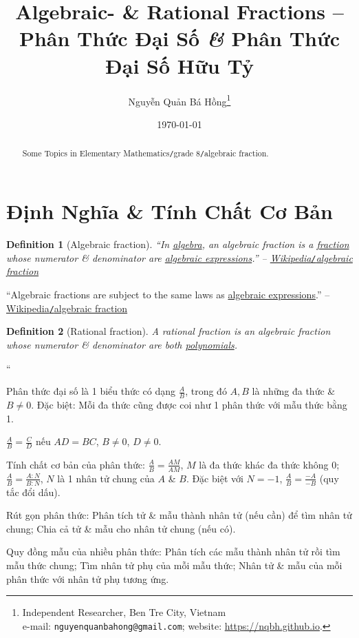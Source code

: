\documentclass{article}
\title{Algebraic- \& Rational Fractions -- Phân Thức Đại Số \textit{\&} Phân Thức Đại Số Hữu Tỷ}
\author{Nguyễn Quản Bá Hồng\footnote{Independent Researcher, Ben Tre City, Vietnam\\e-mail: \texttt{nguyenquanbahong@gmail.com}; website: \url{https://nqbh.github.io}.}}
\date{\today}
\numberwithin{equation}{section}
\newtheorem{definition}{Definition}[section]
\begin{document}
\maketitle
\begin{abstract}
	Some Topics in Elementary Mathematics\texttt{/}grade 8\texttt{/}algebraic fraction.
\end{abstract}
\setcounter{secnumdepth}{4}
\setcounter{tocdepth}{3}
\tableofcontents


\section{Định Nghĩa \& Tính Chất Cơ Bản}

\begin{definition}[Algebraic fraction]
	``In \href{https://en.wikipedia.org/wiki/Algebra}{algebra}, an \emph{algebraic fraction} is a \href{https://en.wikipedia.org/wiki/Fraction_(mathematics)}{fraction} whose numerator \& denominator are \href{https://en.wikipedia.org/wiki/Algebraic_expression}{algebraic expressions}.'' -- \href{https://en.wikipedia.org/wiki/Algebraic_fraction}{Wikipedia\emph{\texttt{/}}algebraic fraction}
\end{definition}
``Algebraic fractions are subject to the same laws as \href{https://en.wikipedia.org/wiki/Arithmetic_fraction}{algebraic expressions}.'' -- \href{https://en.wikipedia.org/wiki/Algebraic_fraction}{Wikipedia\texttt{/}algebraic fraction}

\begin{definition}[Rational fraction]
	A \emph{rational fraction} is an algebraic fraction whose numerator \& denominator are both \href{https://en.wikipedia.org/wiki/Polynomial}{polynomials}.
\end{definition}
``\begin{enumerate*}
	\item[\textbf{1.}] Phân thức đại số là 1 biểu thức có dạng $\frac{A}{B}$, trong đó $A,B$ là những đa thức \& $B\ne 0$. Đặc biệt: Mỗi đa thức cũng được coi như 1 phân thức với mẫu thức bằng 1.
	\item[\textbf{2.}] $\frac{A}{B} = \frac{C}{D}$ nếu $AD = BC$, $B\ne 0$, $D\ne 0$.
	\item[\textbf{3.}] Tính chất cơ bản của phân thức: $\frac{A}{B} = \frac{AM}{AM}$, $M$ là đa thức khác đa thức không 0; $\frac{A}{B} = \frac{A:N}{B:N}$, $N$ là 1 nhân tử chung của $A$ \& $B$. Đặc biệt với $N = -1$, $\frac{A}{B} = \frac{-A}{-B}$ (quy tắc đổi dấu).
	\item[\textbf{4.}] Rút gọn phân thức: Phân tích tử \& mẫu thành nhân tử (nếu cần) để tìm nhân tử chung; Chia cả tử \& mẫu cho nhân tử chung (nếu có).
	\item[\textbf{5.}] Quy đồng mẫu của nhiều phân thức: Phân tích các mẫu thành nhân tử rồi tìm mẫu thức chung; Tìm nhân tử phụ của mỗi mẫu thức; Nhân tử \& mẫu của mỗi phân thức với nhân tử phụ tương ứng.
\end{enumerate*}
\end{document}
